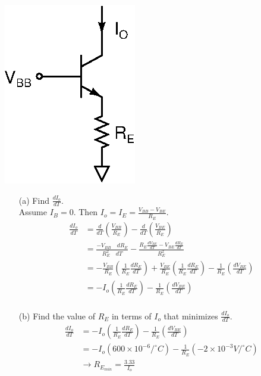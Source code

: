 \documentclass[11pt,twoside]{article}
\begin{document}
\begin{center}
\includegraphics[width=.25\textwidth]{temp-dep.eps}
\end{center}

\begin{enumerate}
	\item[(a)] Find $\frac{dI_o}{dT}$.\\
\vspace{1ex}
Assume $I_B=0$.  Then $I_o=I_E=\frac{V_{BB}-V_{BE}}{R_E}$.
\begin{align*}
\frac{dI_o}{dT} &= \frac{d}{dT}(\frac{V_{BB}}{R_E})-\frac{d}{dT}(\frac{V_{BE}}{R_E})\\
 &= \frac{-V_{BB}\quad dR_E}{R_E^2 \quad dT}-\frac{R_E\frac{dV_{BE}}{dT}-V_{BE}\frac{dR_E}{dT}}{R_E^2}\\
 &= -\frac{V_{BB}}{R_E}(\frac{1}{R_E}\frac{dR_E}{dT})+
\frac{V_{BE}}{R_E}(\frac{1}{R_E}\frac{dR_E}{dT})-
\frac{1}{R_E}(\frac{dV_{BE}}{dT})\\
&= -I_o(\frac{1}{R_E}\frac{dR_E}{dT})-\frac{1}{R_E}(\frac{dV_{BE}}{dT})\\
\end{align*}

	\item[(b)] Find the value of $R_E$ in terms of $I_o$ that minimizes $\frac{dI_o}{dT}$.
\begin{align*}
\frac{dI_o}{dT} &= -I_o(\frac{1}{R_E}\frac{dR_E}{dT})-\frac{1}{R_E}(\frac{dV_{BE}}{dT})\\
&= -I_o(600\times10^{-6}/^{\circ} C)-\frac{1}{R_E}(-2\times10^{-3}V/^{\circ} C)\\
&\rightarrow R_{E_{min}}=\frac{3.33}{I_o}\\
\end{align*}
\end{enumerate}
\end{document}
